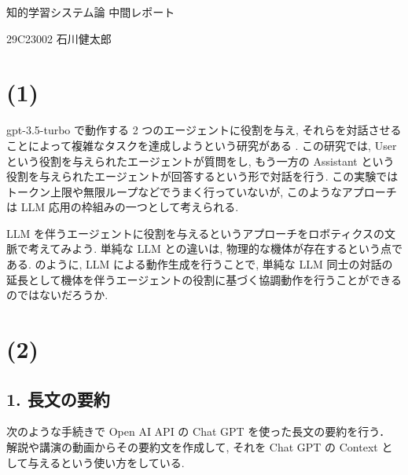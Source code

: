 \documentclass[uplatex, a4j, 10pt, fleqn, dvipdfmx]{article}
\begin{document}
\begin{center}
    {\Huge 知的学習システム論 \quad 中間レポート}
\end{center}

\begin{flushright}
    {\qquad 29C23002 \quad 石川健太郎}
\end{flushright}

\section*{(1)}

gpt-3.5-turbo で動作する 2 つのエージェントに役割を与え,
それらを対話させることによって複雑なタスクを達成しようという研究がある \cite{ref1}.
この研究では, User という役割を与えられたエージェントが質問をし,
もう一方の Assistant という役割を与えられたエージェントが回答するという形で対話を行う.
この実験ではトークン上限や無限ループなどでうまく行っていないが,
このようなアプローチは LLM 応用の枠組みの一つとして考えられる.

LLM を伴うエージェントに役割を与えるというアプローチをロボティクスの文脈で考えてみよう.
単純な LLM との違いは, 物理的な機体が存在するという点である.
\cite{ref2} のように, LLM による動作生成を行うことで,
単純な LLM 同士の対話の延長として機体を伴うエージェントの役割に基づく協調動作を行うことができるのではないだろうか.

\section*{(2)}

\subsection*{1. 長文の要約}

次のような手続きで Open AI API の Chat GPT を使った長文の要約を行う．
解説や講演の動画からその要約文を作成して, それを Chat GPT の Context として与えるという使い方をしている.
\end{document}

